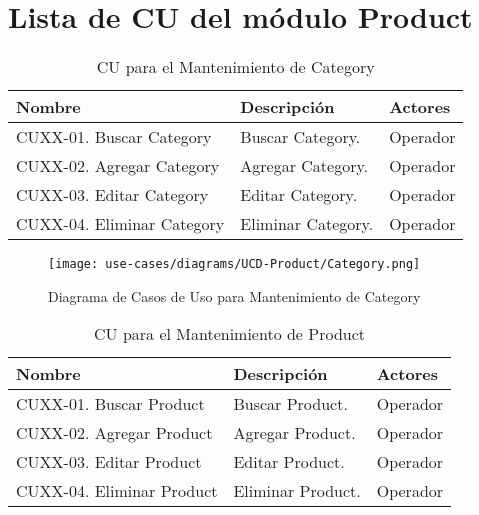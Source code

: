 
	\section{Lista de CU del m\'odulo Product} \label{sec:uc-product}

	\begin{table}[H]
		\caption{CU para el Mantenimiento de Category}
		\label{uc-entity-category}
		\begin{center}
		\begin{tabularx}{0.90\linewidth}{ X X X }
			\hline
			\textbf{Nombre} & \textbf{Descripci\'on} & \textbf{Actores} \\
			\hline
			CUXX-01. Buscar Category & Buscar Category. & Operador \\
			CUXX-02. Agregar Category & Agregar Category. & Operador \\
			CUXX-03. Editar Category & Editar Category. & Operador \\
			CUXX-04. Eliminar Category & Eliminar Category. & Operador \\
			\hline
		\end{tabularx}
		\end{center}
	\end{table}
	
	\begin{figure}[H]
		\begin{center}
		\label{tab:ucd-entity-category}
		\texttt{[image: use-cases/diagrams/UCD-Product/Category.png]}
		\caption{Diagrama de Casos de Uso para Mantenimiento de Category}
		\end{center}
	\end{figure}
	\begin{table}[H]
		\caption{CU para el Mantenimiento de Product}
		\label{uc-entity-product}
		\begin{center}
		\begin{tabularx}{0.90\linewidth}{ X X X }
			\hline
			\textbf{Nombre} & \textbf{Descripci\'on} & \textbf{Actores} \\
			\hline
			CUXX-01. Buscar Product & Buscar Product. & Operador \\
			CUXX-02. Agregar Product & Agregar Product. & Operador \\
			CUXX-03. Editar Product & Editar Product. & Operador \\
			CUXX-04. Eliminar Product & Eliminar Product. & Operador \\
			\hline
		\end{tabularx}
		\end{center}
	\end{table}
	
